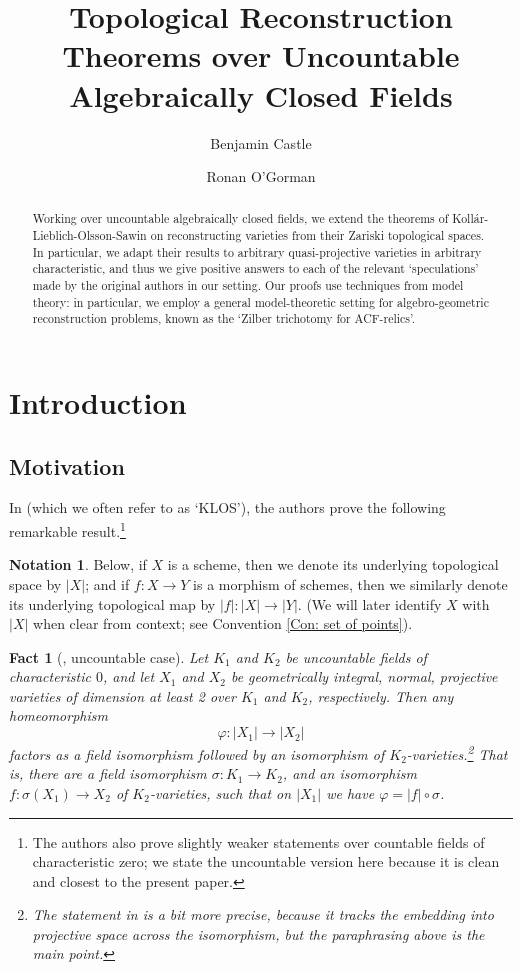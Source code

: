 \documentclass{amsart}
\title[Topological Reconstruction Theorems]{Topological Reconstruction Theorems over Uncountable Algebraically Closed Fields}
\author{Benjamin Castle}
\author{Ronan O'Gorman}
\newtheorem{fact}[theorem]{Fact}
\theoremstyle{definition}
\newtheorem{notation}[theorem]{Notation}
\begin{document}
\maketitle

\begin{abstract}
    Working over uncountable algebraically closed fields, we extend the theorems of Koll\'ar-Lieblich-Olsson-Sawin on reconstructing varieties from their Zariski topological spaces. In particular, we adapt their results to arbitrary quasi-projective varieties in arbitrary characteristic, and thus we give positive answers to each of the relevant `speculations' made by the original authors in our setting. Our proofs use techniques from model theory: in particular, we employ a general model-theoretic setting for algebro-geometric reconstruction problems, known as the `Zilber trichotomy for ACF-relics'. 
\end{abstract}

\tableofcontents

\section{Introduction}

\subsection{Motivation} In \cite{KLOS} (which we often refer to as `KLOS'), the authors prove the following remarkable result.\footnote{The authors also prove slightly weaker statements over countable fields of characteristic zero; we state the uncountable version here because it is clean and closest to the present paper.}

\begin{notation}
    Below, if $X$ is a scheme, then we denote its underlying topological space by $|X|$; and if $f:X\rightarrow Y$ is a morphism of schemes, then we similarly denote its underlying topological map by $|f|:|X|\rightarrow|Y|$. (We will later identify $X$ with $|X|$ when clear from context; see Convention \ref{Con: set of points}).
\end{notation}

\begin{fact}[\cite{KLOS}, uncountable case]\label{F: KLOS}
Let $K_1$ and $K_2$ be uncountable fields of characteristic $0$, and let $X_1$ and $X_2$ be geometrically integral, normal, projective varieties of dimension at least 2 over $K_1$ and $K_2$, respectively. Then any homeomorphism
\[
\varphi : |X_1| \to |X_2|
\]
    factors as a field isomorphism followed by an isomorphism of $K_2$-varieties.\footnote{The statement in \cite[Main Theorem 1.2.1]{KLOS} is a bit more precise, because it tracks the embedding into projective space across the isomorphism, but the paraphrasing above is the main point.} That is, there are a field isomorphism $\sigma:K_1\rightarrow K_2$, and an isomorphism $f:\sigma(X_1)\rightarrow X_2$ of $K_2$-varieties, such that on $|X_1|$ we have $\varphi=|f|\circ\sigma$.
\end{fact}
\end{document}
